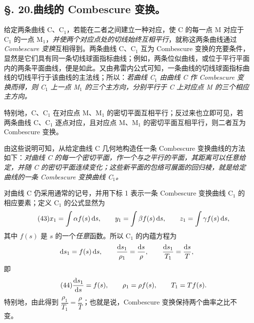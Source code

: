 \subsection*{\S. 20.\quad 曲线的 Combescure 变换。}
给定两条曲线 C、C\(_1\)，若能在二者之间建立一种对应，使 C 的每一点 M 对应于 C\(_1\) 的一点 M\(_1\)，\emph{并使两个对应点处的切线始终互相平行}，就称这两条曲线通过\emph{Combescure 变换}互相得到。两条曲线 C、C\(_1\) 互为 Combescure 变换的充要条件，显然是它们具有同一条切线球面指标曲线；例如，两条位似曲线，或位于平行平面内的两条平面曲线，便是如此。又由弗雷内公式可知，一条曲线的切线球面指标曲线的切线平行于该曲线的主法线；所以：\emph{若曲线 C\(_1\) 由曲线 C 作 Combescure 变换而得，则 C\(_1\) 上一点 M\(_1\) 的三个主方向，分别平行于 C 上对应点 M 的三个相应主方向。}

特别地，C、C\(_1\) 在对应点 M、M\(_1\) 的密切平面互相平行；反过来也立即可见，若两条曲线 C、C\(_1\) 逐点对应，且对应点 M、M\(_1\) 的密切平面互相平行，则二者互为 Combescure 变换。

由这些说明可知，从给定曲线 C 几何地构造任一条 Combescure 变换曲线的方法如下：\emph{对曲线 C 的每一个密切平面，作一个与之平行的平面，其距离可以任意给定，并随 C 的密切平面连续变化；这些新平面的包络可展面的回归棱，就是给定曲线的一条 Combescure 变换曲线 C\(_1\)。}

对曲线 C 仍采用通常的记号，并用下标 1 表示一条 Combescure 变换曲线 C\(_1\) 的相应要素；定义 C\(_1\) 的公式显然为
\begin{equation}\tag{43}
x_1=\int\alpha f(s)\,\mathrm{d} s,
\qquad y_1=\int\beta f(s)\,\mathrm{d} s,
\qquad z_1=\int\gamma f(s)\,\mathrm{d} s,
\end{equation}
其中 \(f(s)\) 是 \(s\) 的一个\emph{任意}函数。所以 C\(_1\) 的内蕴方程为
\[
\mathrm{d} s_1=f(s)\,\mathrm{d} s,
\qquad
\frac{\mathrm{d} s_1}{\rho_1}=\frac{\mathrm{d} s}{\rho},
\qquad
\frac{\mathrm{d} s_1}{T_1}=\frac{\mathrm{d} s}{T},
\]
即
\begin{equation}\tag{44}
\frac{\mathrm{d} s_1}{\mathrm{d} s}=f(s),\qquad \rho_1=\rho f(s),\qquad T_1=T f(s).
\end{equation}
特别地，由此得到 \(\dfrac{\rho_1}{T_1}=\dfrac{\rho}{T}\)；也就是说，Combescure 变换保持两个曲率之比不变。
